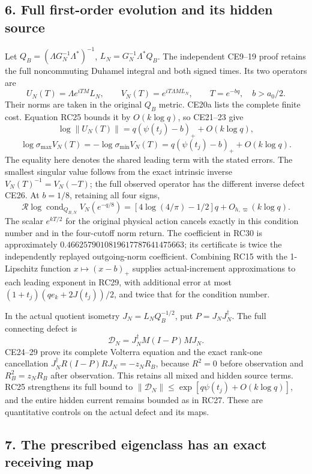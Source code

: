 \documentclass[10pt]{article}
\begin{document}
\subsection{6. Full first-order evolution and its hidden source}\label{full-first-order-evolution-and-its-hidden-source}

Let \(Q_B=(\Lambda G_N^{-1}\Lambda^*)^{-1}\), \(L_N=G_N^{-1}\Lambda^*Q_B\). The independent CE9--19 proof retains the full noncommuting Duhamel integral and both signed times. Its two operators are \[
U_N(T)=\Lambda e^{iTM}L_N,\qquad
V_N(T)=e^{iT\Lambda ML_N},\qquad T=e^{-bq},\quad b>a_0/2.
\tag{RC28}
\] Their norms are taken in the original \(Q_B\) metric. CE20a lists the complete finite cost. Equation RC25 bounds it by \(O(k\log q)\), so CE21--23 give \[
\log\|U_N(T)\|=q(\psi(t_j)-b)_++O(k\log q),
\] \[
\log\sigma_{\max}V_N(T)=-\log\sigma_{\min}V_N(T)
=q(\psi(t_j)-b)_++O(k\log q).
\tag{RC29}
\] The equality here denotes the shared leading term with the stated errors. The smallest singular value follows from the exact intrinsic inverse \(V_N(T)^{-1}=V_N(-T)\); the full observed operator has the different inverse defect CE26. At \(b=1/8\), retaining all four signs, \[
\boxed{\mathcal R\log\operatorname{cond}_{Q_{B,N}}V_N(e^{-q/8})
=[4\log(4/\pi)-1/2]q+O_{h,\varpi}(k\log q).}
\tag{RC30}
\] The scalar \(e^{kT/2}\) for the original physical action cancels exactly in this condition number and in the four-cutoff norm return. The coefficient in RC30 is approximately \(0.4662579010819617787641475663\); its certificate is twice the independently replayed outgoing-norm coefficient. Combining RC15 with the 1-Lipschitz function \(x\mapsto(x-b)_+\) supplies actual-increment approximations to each leading exponent in RC29, with additional error at most \((1+t_j)(qe_k+2J(t_j))/2\), and twice that for the condition number.

In the actual quotient isometry \(J_N=L_NQ_B^{-1/2}\), put \(P=J_NJ_N^\dagger\). The full connecting defect is \[
\mathcal D_N=J_N^\dagger M(I-P)MJ_N.
\tag{RC31}
\] CE24--29 prove its complete Volterra equation and the exact rank-one cancellation \(J_N^\dagger R(I-P)RJ_N=-z_NR_B\), because \(R^2=0\) before observation and \(R_B^2=z_NR_B\) after observation. This retains all mixed and hidden source terms. RC25 strengthens its full bound to \(\|\mathcal D_N\|\le\exp[q\psi(t_j)+O(k\log q)]\), and the entire hidden current remains bounded as in RC27. These are quantitative controls on the actual defect and its maps.

\subsection{7. The prescribed eigenclass has an exact receiving map}\label{the-prescribed-eigenclass-has-an-exact-receiving-map}
\end{document}
